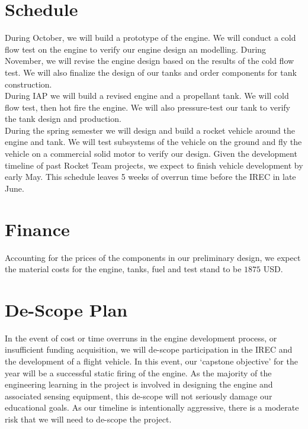 \documentclass{article}
\begin{document}
\section{Schedule}
During October, we will build a prototype of the engine. We will conduct a cold flow test on the engine to verify our engine design an modelling.
During November, we will revise the engine design based on the results of the cold flow test. We will also finalize the design of our tanks and order components for tank construction.\\
During IAP we will build a revised engine and a propellant tank. We will cold flow test, then hot fire the engine. We will also pressure-test our tank to verify the tank design and production.\\
During the spring semester we will design and build a rocket vehicle around the engine and tank. We will test subsystems of the vehicle on the ground and fly the vehicle on a commercial solid motor to verify our design. Given the development timeline of past Rocket Team projects, we expect to finish vehicle development by early May. This schedule leaves 5 weeks of overrun time before the IREC in late June.
\section{Finance}
Accounting for the prices of the components in our preliminary design, we expect the material costs for the engine, tanks, fuel and test stand to
be $1875$ USD.
\section{De-Scope Plan}
In the event of cost or time overruns in the engine development process, or insufficient funding acquisition, we will de-scope participation in the IREC and the development of a flight vehicle. In this event, our `capstone objective' for the year will be a successful static firing of the engine. As the majority of the engineering learning in the project is involved in designing the engine and associated sensing equipment, this de-scope will not seriously damage our educational goals. As our timeline is intentionally aggressive, there is a moderate risk that we will need to de-scope the project.
\end{document}

